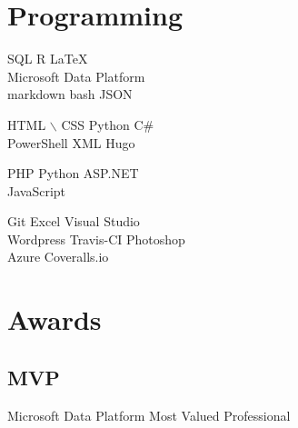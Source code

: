 \documentclass[]{single-page-resume}
\begin{document}
\begin{minipage}[t]{0.3\textwidth}




\section{Programming}
SQL  \textbullet{} R  \textbullet{} \LaTeX \\
Microsoft Data Platform  \\
markdown\textbullet{} bash \textbullet{} JSON
 \sectionsep

HTML $\backslash$ CSS   \textbullet{} Python \textbullet{} C\# \\
PowerShell \textbullet{} XML \textbullet{} Hugo
\sectionsep

PHP \textbullet{} Python  \textbullet{} ASP.NET \\
JavaScript
\sectionsep

Git \textbullet{} Excel \textbullet{} Visual Studio \\
Wordpress \textbullet{} Travis-CI \textbullet{} Photoshop \\
Azure \textbullet{} Coveralls.io   \\
\section{Awards}
\subsection{MVP}
Microsoft Data Platform Most Valued Professional


%
%

\end{minipage} 
\hfill
\end{document}
